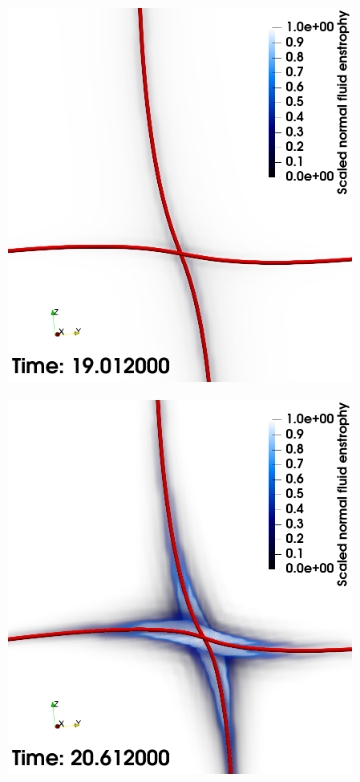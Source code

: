 \documentclass[%
 reprint,
 amsmath,amssymb,
 aps,
 prl,
]{revtex4-2}
\begin{document}
\begin{figure}
	\centering
	\begin{subfigure}[b]{0.24\textwidth}
		\centering
		\includegraphics*[width=\textwidth]{snap-1.png}
	\end{subfigure}
	\begin{subfigure}[b]{0.24\textwidth}
		\centering
		\includegraphics*[width=\textwidth]{snap-2.png}

\end{subfigure}
\end{figure}
\end{document}
